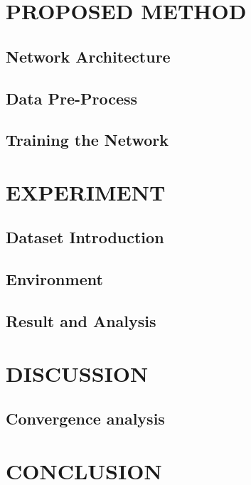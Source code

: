 \documentclass{article}
\begin{document}
	\section{PROPOSED METHOD}\label{sec:proposed-method}

	\subsection{Network Architecture}\label{subsec:network-architecture}

	\subsection{Data Pre-Process}\label{subsec:data-pre-process}

	\subsection{Training the Network}\label{subsec:training-the-network}


	\section{EXPERIMENT}\label{sec:experiment}

	\subsection{Dataset Introduction}\label{subsec:dataset-introduction}

	\subsection{Environment}\label{subsec:environment}

	\subsection{Result and Analysis}\label{subsec:result-and-analysis}


	\section{DISCUSSION}\label{sec:discussion}

	\subsection{Convergence analysis}\label{subsec:convergence}



	\section{CONCLUSION}\label{sec:conclusion}
\end{document}
